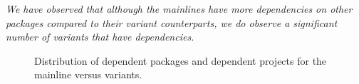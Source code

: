 \begin{framed} 
\noindent
\emph{We have observed that although the mainlines have more dependencies on other packages compared to their variant counterparts, we do observe a significant number of variants that have dependencies.}
\end{framed}

\begin{figure}[htbp]%
\vspace{-.3cm}
    \centering
    \qquad
    \caption{Distribution of dependent packages and dependent projects for the mainline versus variants.}%
    \label{fig:packages_and_projects}%
\end{figure}


